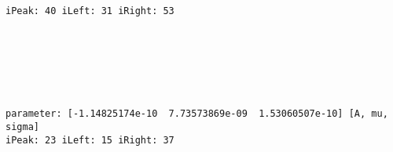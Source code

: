 \documentclass[11pt]{article}
\begin{document}
    \begin{Verbatim}[commandchars=\\\{\}]
iPeak: 40 iLeft: 31 iRight: 53

    \end{Verbatim}

    \begin{center}
    \end{center}
    { \hspace*{\fill} \\}
    
    \begin{center}
    \end{center}
    { \hspace*{\fill} \\}
    
    \begin{center}
    \end{center}
    { \hspace*{\fill} \\}
    
    \begin{Verbatim}[commandchars=\\\{\}]
parameter: [-1.14825174e-10  7.73573869e-09  1.53060507e-10] [A, mu, sigma]
iPeak: 23 iLeft: 15 iRight: 37

    \end{Verbatim}

    \begin{center}
    \end{center}
    { \hspace*{\fill} \\}
    
    \begin{center}
    \end{center}
    { \hspace*{\fill} \\}
    
    \begin{center}
    \end{center}
    { \hspace*{\fill} \\}
    
\end{document}
